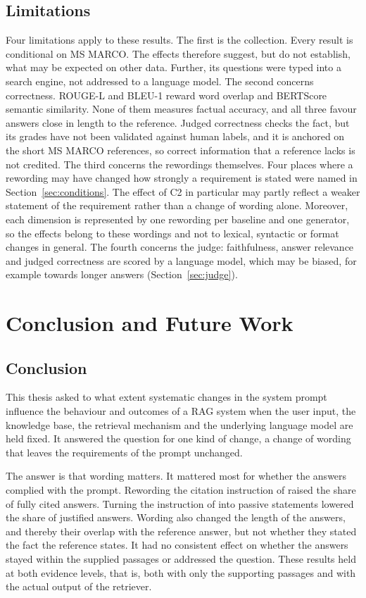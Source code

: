 \documentclass[12pt,a4paper,oneside]{scrreprt}
\begin{document}
\section{Limitations}
\label{sec:limits}
Four limitations apply to these results. The first is the collection. Every result is conditional on MS MARCO. The effects therefore suggest, but do not establish, what may be expected on other data. Further, its questions were typed into a search engine, not addressed to a language model. The second concerns correctness. ROUGE-L and BLEU-1 reward word overlap and BERTScore semantic similarity. None of them measures factual accuracy, and all three favour answers close in length to the reference. Judged correctness checks the fact, but its grades have not been validated against human labels, and it is anchored on the short MS MARCO references, so correct information that a reference lacks is not credited. The third concerns the rewordings themselves. Four places where a rewording may have changed how strongly a requirement is stated were named in Section~\ref{sec:conditions}. The effect of C2 in particular may partly reflect a weaker statement of the requirement rather than a change of wording alone. Moreover, each dimension is represented by one rewording per baseline and one generator, so the effects belong to these wordings and not to lexical, syntactic or format changes in general. The fourth concerns the judge: faithfulness, answer relevance and judged correctness are scored by a language model, which may be biased, for example towards longer answers (Section~\ref{sec:judge}).


\chapter{Conclusion and Future Work}
\label{ch:conclusion}

\section{Conclusion}

This thesis asked to what extent systematic changes in the system prompt influence the behaviour and outcomes of a RAG system when the user input, the knowledge base, the retrieval mechanism and the underlying language model are held fixed. It answered the question for one kind of change, a change of wording that leaves the requirements of the prompt unchanged.

The answer is that wording matters. It mattered most for whether the answers complied with the prompt. Rewording the citation instruction of \citet{gao2023alce} raised the share of fully cited answers. Turning the instruction of \citet{mao2024fitrag} into passive statements lowered the share of justified answers. Wording also changed the length of the answers, and thereby their overlap with the reference answer, but not whether they stated the fact the reference states. It had no consistent effect on whether the answers stayed within the supplied passages or addressed the question. These results held at both evidence levels, that is, both with only the supporting passages and with the actual output of the retriever.
\end{document}
